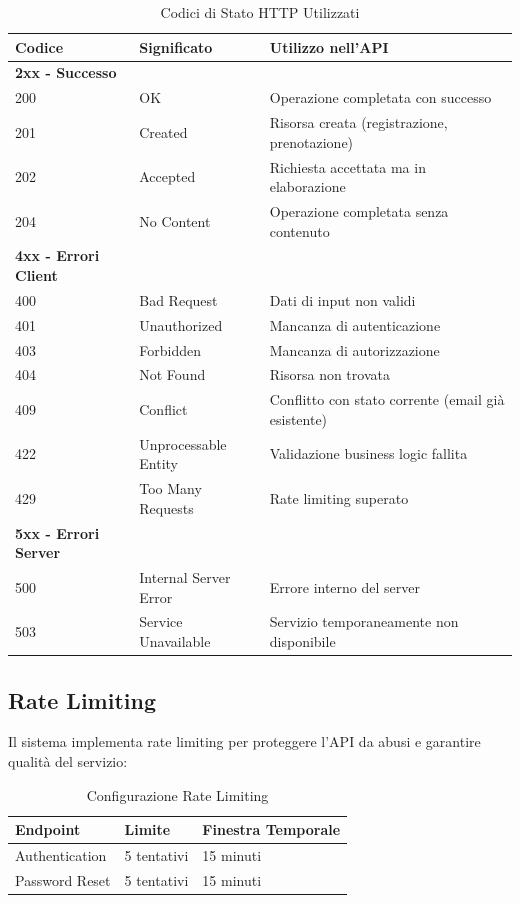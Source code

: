 \begin{table}[H]
\centering
\begin{tabular}{@{}lp{4cm}p{7cm}@{}}
\toprule
\textbf{Codice} & \textbf{Significato} & \textbf{Utilizzo nell'API} \\
\midrule
\textbf{2xx - Successo} & & \\
200 & OK & Operazione completata con successo \\
201 & Created & Risorsa creata (registrazione, prenotazione) \\
202 & Accepted & Richiesta accettata ma in elaborazione \\
204 & No Content & Operazione completata senza contenuto \\
\midrule
\textbf{4xx - Errori Client} & & \\
400 & Bad Request & Dati di input non validi \\
401 & Unauthorized & Mancanza di autenticazione \\
403 & Forbidden & Mancanza di autorizzazione \\
404 & Not Found & Risorsa non trovata \\
409 & Conflict & Conflitto con stato corrente (email già esistente) \\
422 & Unprocessable Entity & Validazione business logic fallita \\
429 & Too Many Requests & Rate limiting superato \\
\midrule
\textbf{5xx - Errori Server} & & \\
500 & Internal Server Error & Errore interno del server \\
503 & Service Unavailable & Servizio temporaneamente non disponibile \\
\bottomrule
\end{tabular}
\caption{Codici di Stato HTTP Utilizzati}
\end{table}

\subsection{Rate Limiting}
Il sistema implementa rate limiting per proteggere l'API da abusi e garantire qualità del servizio:

\begin{table}[H]
\centering
\begin{tabular}{@{}lll@{}}
\toprule
\textbf{Endpoint} & \textbf{Limite} & \textbf{Finestra Temporale} \\
\midrule
Authentication & 5 tentativi & 15 minuti \\
Password Reset & 5 tentativi & 15 minuti \\
\bottomrule
\end{tabular}
\caption{Configurazione Rate Limiting}
\end{table}

